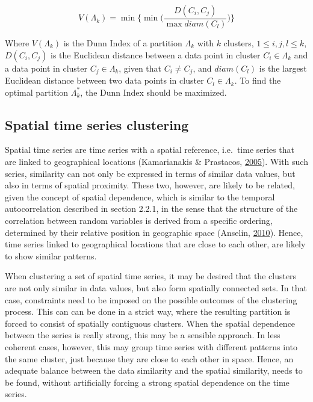 \documentclass[12pt,oneside]{reedthesis}
\begin{document}
\[ V(\Lambda_{k}) = \min \Bigg\{ \min \Bigg(\frac{D(C_{i}, C_{j})}{\max diam(C_{l})} \Bigg) \Bigg\} \]

Where \(V(\Lambda_{k})\) is the Dunn Index of a partition
\(\Lambda_{k}\) with \(k\) clusters, \(1 \leq i, j, l \leq k\),
\(D(C_{i}, C_{j})\) is the Euclidean distance between a data point in
cluster \(C_{i} \in \Lambda_{k}\) and a data point in cluster
\(C_{j} \in \Lambda_{k}\), given that \(C_{i} \neq C_{j}\), and
\(diam(C_{l})\) is the largest Euclidean distance between two data
points in cluster \(C_{l} \in \Lambda_{k}\). To find the optimal
partition \(\Lambda_{k}^*\), the Dunn Index should be maximized.

\subsection{Spatial time series
clustering}\label{spatial-time-series-clustering}

Spatial time series are time series with a spatial reference, i.e.~time
series that are linked to geographical locations (Kamarianakis \&
Prastacos, \protect\hyperlink{ref-kamarianakis2005}{2005}). With such
series, similarity can not only be expressed in terms of similar data
values, but also in terms of spatial proximity. These two, however, are
likely to be related, given the concept of spatial dependence, which is
similar to the temporal autocorrelation described in section 2.2.1, in
the sense that the structure of the correlation between random variables
is derived from a specific ordering, determined by their relative
position in geographic space (Anselin,
\protect\hyperlink{ref-anselin2010}{2010}). Hence, time series linked to
geographical locations that are close to each other, are likely to show
similar patterns.

When clustering a set of spatial time series, it may be desired that the
clusters are not only similar in data values, but also form spatially
connected sets. In that case, constraints need to be imposed on the
possible outcomes of the clustering process. This can can be done in a
strict way, where the resulting partition is forced to consist of
spatially contiguous clusters. When the spatial dependence between the
series is really strong, this may be a sensible approach. In less
coherent cases, however, this may group time series with different
patterns into the same cluster, just because they are close to each
other in space. Hence, an adequate balance between the data similarity
and the spatial similarity, needs to be found, without artificially
forcing a strong spatial dependence on the time series.
\end{document}
